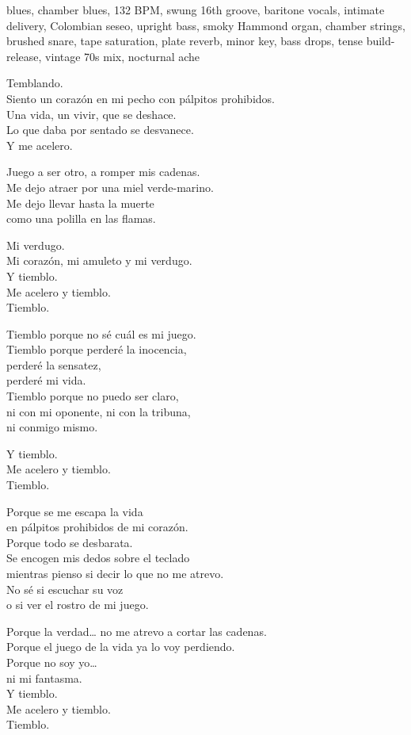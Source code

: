 
\label{sec:temblando}
\begin{notes}
\end{notes}
\begin{style}
blues, chamber blues, 132 BPM, swung 16th groove, baritone vocals, intimate delivery, Colombian seseo, upright bass, smoky Hammond organ, chamber strings, brushed snare, tape saturation, plate reverb, minor key, bass drops, tense build-release, vintage 70s mix, nocturnal ache
\end{style}
\begin{lyrics}
Temblando.\\
Siento un corazón en mi pecho con pálpitos prohibidos.\\
Una vida, un vivir, que se deshace.\\
Lo que daba por sentado se desvanece.\\
Y me acelero.

Juego a ser otro, a romper mis cadenas.\\
Me dejo atraer por una miel verde-marino.\\
Me dejo llevar hasta la muerte\\
como una polilla en las flamas.

Mi verdugo.\\
Mi corazón, mi amuleto y mi verdugo.\\
Y tiemblo.\\
Me acelero y tiemblo.\\
Tiemblo.

Tiemblo porque no sé cuál es mi juego.\\
Tiemblo porque perderé la inocencia,\\
perderé la sensatez,\\
perderé mi vida.\\
Tiemblo porque no puedo ser claro,\\
ni con mi oponente, ni con la tribuna,\\
ni conmigo mismo.

Y tiemblo.\\
Me acelero y tiemblo.\\
Tiemblo.

Porque se me escapa la vida\\
en pálpitos prohibidos de mi corazón.\\
Porque todo se desbarata.\\
Se encogen mis dedos sobre el teclado\\
mientras pienso si decir lo que no me atrevo.\\
No sé si escuchar su voz\\
o si ver el rostro de mi juego.

Porque la verdad… no me atrevo a cortar las cadenas.\\
Porque el juego de la vida ya lo voy perdiendo.\\
Porque no soy yo…\\
ni mi fantasma.\\
Y tiemblo.\\
Me acelero y tiemblo.\\
Tiemblo.
\end{lyrics}

